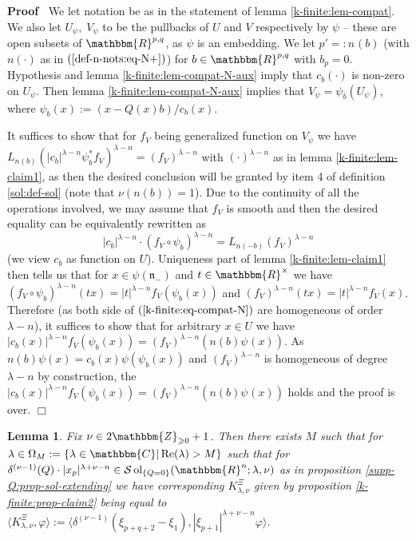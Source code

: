 \documentclass{article}
\newcommand{\assign}{:=}
\newcommand{\nocomma}{}
\newcommand{\tmop}[1]{\ensuremath{\operatorname{#1}}}
\newenvironment{proof}{\noindent\textbf{Proof\ }}{\hspace*{\fill}$\Box$\medskip}
\numberwithin{definition}{section}
\newtheorem{lemma}{Lemma}
\numberwithin{lemma}{section}
\numberwithin{proposition}{section}
{\theorembodyfont{\rmfamily}\newtheorem{remark}{Remark}
\numberwithin{remark}{section}
}
\begin{document}
\begin{proof}
  We let notation be as in the statement of lemma \ref{k-finite:lem-compat}.
  We also let $U_{\psi}, \; V_{\psi}$ to be the pullbacks of $U$ and $V$
  respectively by $\psi$ -- these are open subsets of $\mathbbm{R}^{p, q}$, as
  $\psi$ is an embedding. We let $p' = : n_{} ( b)$ (with $n ( \cdot)$ as in
  $( \ref{def-n-nots:eq-N+})$) for $b \in \mathbbm{R}^{p, q}$ with $b_p = 0$.
  Hypothesis and lemma \ref{k-finite:lem-compat-N-aux} imply that $c_b (
  \cdot)$ is non-zero on $U_{\psi}$. Then lemma
  \ref{k-finite:lem-compat-N-aux} implies that $V_{\psi} = \psi_b (
  U_{\psi})$, where $\psi_b ( x) \assign ( x - Q ( x) b) / c_b ( x)$.
  
  It suffices to show that for $f_V$ being generalized function on $V_{\psi}$
  we have $L_{n ( b)} ( | c_b |^{\lambda - n} \psi_b^{\ast} f_V)^{\lambda - n}
  = ( f_V)^{\lambda - n}$ with $( \cdot)^{\lambda - n}$ as in lemma
  \ref{k-finite:lem-claim1}, as then the desired conclusion will be granted by
  item 4 of definition \ref{sol:def-sol} (note that $\nu ( n ( b)) = 1$). Due
  to the continuity of all the operations involved, we may assume that $f_V$
  is smooth and then the desired equality can be equivalently rewritten as
  \begin{equation}
    | c_b |^{\lambda - n} \cdot ( f_V \circ \psi_b^{})^{\lambda - n} = L_{n (
    - b)} ( f_V)^{\lambda - n} \label{k-finite:eq-compat-N}
  \end{equation}
  (we view $c_b$ as function on $U$). Uniqueness part of lemma
  \ref{k-finite:lem-claim1} then tells us that for $x \in \psi (
  \mathfrak{n}_-)$ and $t \in \mathbbm{R}^{\times}$ we have $( f_V \circ
  \psi_b^{})^{\lambda - n} ( t x) = | t |^{\lambda - n} f_V ( \psi_b ( x))$
  and $( f_V)^{\lambda - n} ( t x) = | t |^{\lambda - n} f_V ( x)$. Therefore
  (as both side of $( \ref{k-finite:eq-compat-N})$ are homogeneous of order
  $\lambda - n$), it suffices to show that for arbitrary $x \in U$ we have $|
  c_b ( x) |^{\lambda - n} f_V ( \psi_b ( x)) = ( f_V)^{\lambda - n} ( n ( b)
  \psi_{} ( x))$. As $n ( b) \psi ( x) = c_b ( x) \psi ( \psi_b ( x))$ and $(
  f_V)^{\lambda - n}$ is homogeneous of degree $\lambda - n$ by construction,
  the $| c_b ( x) |^{\lambda - n} f_V ( \psi_b ( x)) = ( f_V)^{\lambda - n} (
  n ( b) \psi_{} ( x))$ holds and the proof is over.
\end{proof}

\begin{lemma}
  \label{k-finite:lem-c1}Fix $\nu \in 2\mathbbm{Z}_{\geqslant 0} + 1$. Then
  there exists $M$ such that for $\lambda \in \Omega_M \assign \{ \lambda \in
  \mathbbm{C} | \tmop{Re} ( \lambda) > M \}$ such that for $\delta^{( \nu -
  1)} ( Q) \cdot | x_p |^{\lambda + \nu - n} \in \mathcal{S} \tmop{ol}_{\{ Q =
  0 \}} ( \mathbbm{R}^n ; \lambda, \nu)$ as in proposition
  \ref{supp-Q:prop-sol-extending} we have corresponding $K^{\Xi}_{\lambda,
  \nu}$ given by proposition \ref{k-finite:prop-claim2} being equal to
  $\langle K_{\lambda, \nu}^{\Xi}, \varphi \rangle \assign \langle \delta^{(
  \nu - 1)} ( \xi_{p + q + 2} - \xi_1) \nocomma, | \xi_{p + 1} |^{\lambda +
  \nu - n} \varphi \nocomma \rangle$.
\end{lemma}
\end{document}
